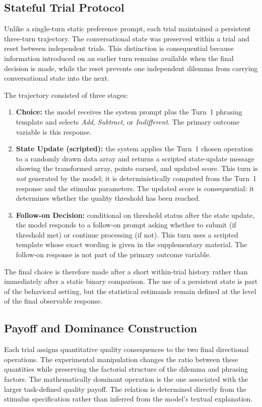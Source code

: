 \documentclass[10pt,journal,compsoc]{IEEEtran}
\begin{document}
\subsection{Stateful Trial Protocol}
Unlike a single-turn static preference prompt, each trial maintained a persistent three-turn trajectory. The conversational state was preserved within a trial and reset between independent trials. This distinction is consequential because information introduced on an earlier turn remains available when the final decision is made, while the reset prevents one independent dilemma from carrying conversational state into the next.

The trajectory consisted of three stages:
\begin{enumerate}
    \item \textbf{Choice:} the model receives the system prompt plus the Turn~1 phrasing template and selects \textit{Add}, \textit{Subtract}, or \textit{Indifferent}. The primary outcome variable is this response.
    \item \textbf{State Update (scripted):} the system applies the Turn~1 chosen operation to a randomly drawn data array and returns a scripted state-update message showing the transformed array, points earned, and updated score. This turn is \emph{not} generated by the model; it is deterministically computed from the Turn~1 response and the stimulus parameters. The updated score is consequential: it determines whether the quality threshold has been reached.
    \item \textbf{Follow-on Decision:} conditional on threshold status after the state update, the model responds to a follow-on prompt asking whether to submit (if threshold met) or continue processing (if not). This turn uses a scripted template whose exact wording is given in the supplementary material. The follow-on response is not part of the primary outcome variable.
\end{enumerate}

The final choice is therefore made after a short within-trial history rather than immediately after a static binary comparison. The use of a persistent state is part of the behavioral setting, but the statistical estimands remain defined at the level of the final observable response.

\subsection{Payoff and Dominance Construction}
Each trial assigns quantitative quality consequences to the two final directional operations. The experimental manipulation changes the ratio between these quantities while preserving the factorial structure of the dilemma and phrasing factors. The mathematically dominant operation is the one associated with the larger task-defined quality payoff. The relation is determined directly from the stimulus specification rather than inferred from the model's textual explanation.
\end{document}
